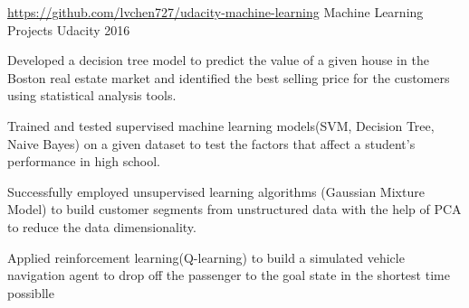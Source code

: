 

\begin{cventries}

  \cventry
  	{\url{https://github.com/lvchen727/udacity-machine-learning}} %
    {Machine Learning Projects}%
    {Udacity} %
    {2016} %
    {
      \begin{cvitems} %
        \item{Developed a decision tree model to predict the value of a given house in the Boston real estate market and identified the best selling price for the customers using statistical analysis tools.}
        \item {Trained and tested supervised machine learning models(SVM, Decision Tree, Naive Bayes) on a given dataset to test the factors that affect a student's performance in high school. }
        \item {Successfully employed unsupervised learning algorithms (Gaussian Mixture Model) to build customer segments from unstructured data with the help of PCA to reduce the data dimensionality.}
        \item {Applied reinforcement learning(Q-learning) to build a simulated vehicle navigation agent to drop off the passenger to the goal state in the shortest time possiblle }
      \end{cvitems}
    }


\end{cventries}
